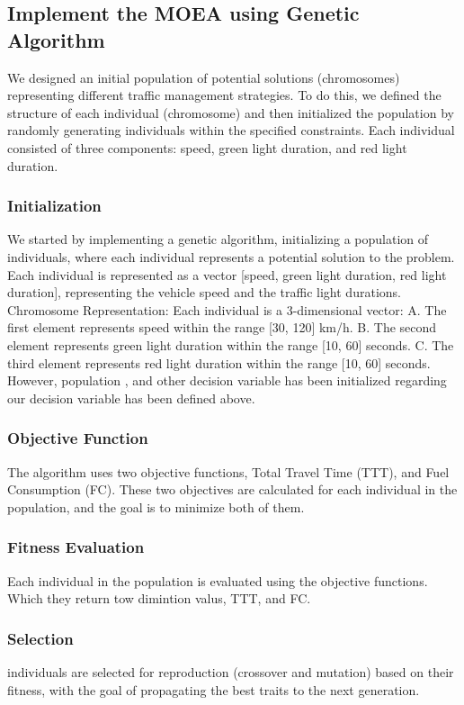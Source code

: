 \subsection{Implement the MOEA using Genetic Algorithm}
We designed an initial population of potential solutions (chromosomes) representing different traffic management strategies. To do this, we defined the structure of each individual (chromosome) and then initialized the population by randomly generating individuals within the specified constraints. Each individual consisted of three components: speed, green light duration, and red light duration.
\subsubsection{Initialization}
We started by implementing a genetic algorithm, initializing a population of individuals, where each individual represents a potential solution to the problem. Each individual is represented as a vector [speed, green light duration, red light duration], representing the vehicle speed and the traffic light durations. 
\newline
Chromosome Representation: Each individual is a 3-dimensional vector:
\newline A. The first element represents speed within the range [30, 120] km/h.
\newline B. The second element represents green light duration within the range [10, 60] seconds.
\newline C. The third element represents red light duration within the range [10, 60] seconds. However, population , and other decision variable has been initialized regarding our decision variable has been defined above.
\subsubsection{Objective Function}
The algorithm uses two objective functions, Total Travel Time (TTT), and Fuel Consumption (FC). These two objectives are calculated for each individual in the population, and the goal is to minimize both of them.
\subsubsection{Fitness Evaluation}
Each individual in the population is evaluated using the objective functions. Which they return tow dimintion valus, TTT, and FC.
\subsubsection{Selection}
 individuals are selected for reproduction (crossover and mutation) based on their fitness, with the goal of propagating the best traits to the next generation.

